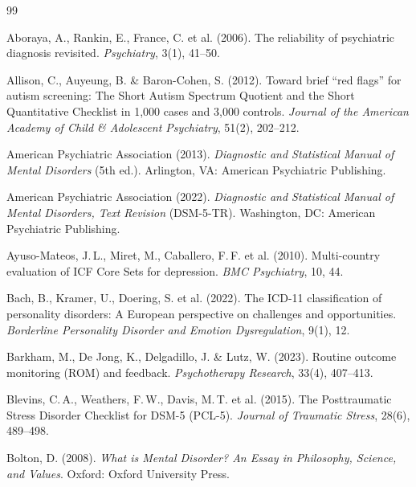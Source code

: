 \documentclass[11pt,a4paper]{article}
\begin{document}
\begin{thebibliography}{99}

Aboraya, A., Rankin, E., France, C. et al. (2006).
\newblock The reliability of psychiatric diagnosis revisited.
\newblock \textit{Psychiatry}, 3(1), 41--50.

Allison, C., Auyeung, B. \& Baron-Cohen, S. (2012).
\newblock Toward brief ``red flags'' for autism screening: The Short Autism Spectrum Quotient and the Short Quantitative Checklist in 1,000 cases and 3,000 controls.
\newblock \textit{Journal of the American Academy of Child \& Adolescent Psychiatry}, 51(2), 202--212.

American Psychiatric Association (2013).
\newblock \textit{Diagnostic and Statistical Manual of Mental Disorders} (5th ed.).
\newblock Arlington, VA: American Psychiatric Publishing.

American Psychiatric Association (2022).
\newblock \textit{Diagnostic and Statistical Manual of Mental Disorders, Text Revision} (DSM-5-TR).
\newblock Washington, DC: American Psychiatric Publishing.

Ayuso-Mateos, J.\,L., Miret, M., Caballero, F.\,F. et al. (2010).
\newblock Multi-country evaluation of ICF Core Sets for depression.
\newblock \textit{BMC Psychiatry}, 10, 44.

Bach, B., Kramer, U., Doering, S. et al. (2022).
\newblock The ICD-11 classification of personality disorders: A European perspective on challenges and opportunities.
\newblock \textit{Borderline Personality Disorder and Emotion Dysregulation}, 9(1), 12.

Barkham, M., De Jong, K., Delgadillo, J. \& Lutz, W. (2023).
\newblock Routine outcome monitoring (ROM) and feedback.
\newblock \textit{Psychotherapy Research}, 33(4), 407--413.

Blevins, C.\,A., Weathers, F.\,W., Davis, M.\,T. et al. (2015).
\newblock The Posttraumatic Stress Disorder Checklist for DSM-5 (PCL-5).
\newblock \textit{Journal of Traumatic Stress}, 28(6), 489--498.

Bolton, D. (2008).
\newblock \textit{What is Mental Disorder? An Essay in Philosophy, Science, and Values}.
\newblock Oxford: Oxford University Press.


\end{thebibliography}
\end{document}
